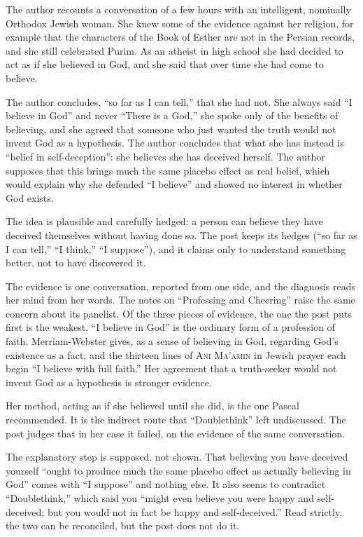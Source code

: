 \begin{afterword}
\summaryhead

The author recounts a conversation of a few hours with an intelligent, nominally Orthodox Jewish woman. She knew some of the evidence against her religion, for example that the characters of the Book of Esther are not in the Persian records, and she still celebrated Purim. As an atheist in high school she had decided to act as if she believed in God, and she said that over time she had come to believe.

The author concludes, ``so far as I can tell,'' that she had not. She always said ``I believe in God'' and never ``There is a God,'' she spoke only of the benefits of believing, and she agreed that someone who just wanted the truth would not invent God as a hypothesis. The author concludes that what she has instead is ``belief in self-deception'': she believes she has deceived herself. The author supposes that this brings much the same placebo effect as real belief, which would explain why she defended ``I believe'' and showed no interest in whether God exists.

\responsehead

The idea is plausible and carefully hedged: a person can believe they have deceived themselves without having done so. The post keeps its hedges (``so far as I can tell,'' ``I think,'' ``I suppose''), and it claims only to understand something better, not to have discovered it.

The evidence is one conversation, reported from one side, and the diagnosis reads her mind from her words. The notes on ``Professing and Cheering'' raise the same concern about its panelist. Of the three pieces of evidence, the one the post puts first is the weakest. ``I believe in God'' is the ordinary form of a profession of faith. Merriam-Webster gives, as a sense of believing in God, regarding God's existence as a fact, and the thirteen lines of \textsc{Ani Ma'amin} in Jewish prayer each begin ``I believe with full faith.'' Her agreement that a truth-seeker would not invent God as a hypothesis is stronger evidence.

Her method, acting as if she believed until she did, is the one Pascal recommended. It is the indirect route that ``Doublethink'' left undiscussed. The post judges that in her case it failed, on the evidence of the same conversation.

The explanatory step is supposed, not shown. That believing you have deceived yourself ``ought to produce much the same placebo effect as actually believing in God'' comes with ``I suppose'' and nothing else. It also seems to contradict ``Doublethink,'' which said you ``might even believe you were happy and self-deceived; but you would not in fact be happy and self-deceived.'' Read strictly, the two can be reconciled, but the post does not do it.


\end{afterword}
